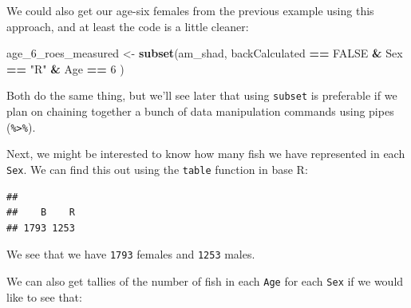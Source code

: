 \documentclass[
]{book}
\newenvironment{Shaded}{\begin{snugshade}}{\end{snugshade}}
\newcommand{\CommentTok}[1]{\textcolor[rgb]{0.56,0.35,0.01}{\textit{#1}}}
\newcommand{\DecValTok}[1]{\textcolor[rgb]{0.00,0.00,0.81}{#1}}
\newcommand{\KeywordTok}[1]{\textcolor[rgb]{0.13,0.29,0.53}{\textbf{#1}}}
\newcommand{\NormalTok}[1]{#1}
\newcommand{\OperatorTok}[1]{\textcolor[rgb]{0.81,0.36,0.00}{\textbf{#1}}}
\newcommand{\OtherTok}[1]{\textcolor[rgb]{0.56,0.35,0.01}{#1}}
\newcommand{\StringTok}[1]{\textcolor[rgb]{0.31,0.60,0.02}{#1}}
\begin{document}
We could also get our age-six females from the previous example using this approach, and at least the code is a little cleaner:

\begin{Shaded}
\begin{Highlighting}[]
\NormalTok{age_}\DecValTok{6}\NormalTok{_roes_measured <-}\StringTok{ }\KeywordTok{subset}\NormalTok{(am_shad,}
\NormalTok{                              backCalculated }\OperatorTok{==}\StringTok{ }\OtherTok{FALSE} \OperatorTok{&}
\StringTok{                                }\NormalTok{Sex }\OperatorTok{==}\StringTok{ "R"} \OperatorTok{&}
\StringTok{                                }\NormalTok{Age }\OperatorTok{==}\StringTok{ }\DecValTok{6}
\NormalTok{                              )}
\end{Highlighting}
\end{Shaded}

Both do the same thing, but we'll see later that using \texttt{subset} is preferable if we plan on chaining together a bunch of data manipulation commands using pipes (\texttt{\%\textgreater{}\%}).

Next, we might be interested to know how many fish we have represented in each \texttt{Sex}. We can find this out using the \texttt{table} function in base R:

\begin{Shaded}
\end{Shaded}

\begin{verbatim}
## 
##    B    R 
## 1793 1253
\end{verbatim}

We see that we have \texttt{1793} females and \texttt{1253} males.

We can also get tallies of the number of fish in each \texttt{Age} for each \texttt{Sex} if we would like to see that:

\begin{Shaded}
\end{Shaded}
\end{document}
